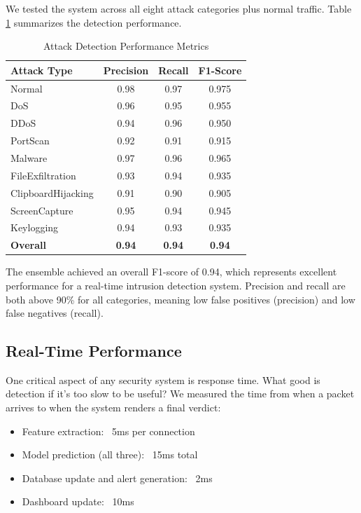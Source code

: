 \documentclass[conference]{IEEEtran}
\begin{document}
We tested the system across all eight attack categories plus normal traffic. Table \ref{tab:results} summarizes the detection performance.

\begin{table}[htbp]
\caption{Attack Detection Performance Metrics}
\label{tab:results}
\centering
\begin{tabular}{|l|c|c|c|}
\hline
\textbf{Attack Type} & \textbf{Precision} & \textbf{Recall} & \textbf{F1-Score} \\
\hline
Normal & 0.98 & 0.97 & 0.975 \\
DoS & 0.96 & 0.95 & 0.955 \\
DDoS & 0.94 & 0.96 & 0.950 \\
PortScan & 0.92 & 0.91 & 0.915 \\
Malware & 0.97 & 0.96 & 0.965 \\
FileExfiltration & 0.93 & 0.94 & 0.935 \\
ClipboardHijacking & 0.91 & 0.90 & 0.905 \\
ScreenCapture & 0.95 & 0.94 & 0.945 \\
Keylogging & 0.94 & 0.93 & 0.935 \\
\hline
\textbf{Overall} & \textbf{0.94} & \textbf{0.94} & \textbf{0.94} \\
\hline
\end{tabular}
\end{table}

The ensemble achieved an overall F1-score of 0.94, which represents excellent performance for a real-time intrusion detection system. Precision and recall are both above 90\% for all categories, meaning low false positives (precision) and low false negatives (recall).

\subsection{Real-Time Performance}

One critical aspect of any security system is response time. What good is detection if it's too slow to be useful? We measured the time from when a packet arrives to when the system renders a final verdict:

\begin{itemize}
\item Feature extraction: ~5ms per connection
\item Model prediction (all three): ~15ms total
\item Database update and alert generation: ~2ms
\item Dashboard update: ~10ms
\end{itemize}
\end{document}
